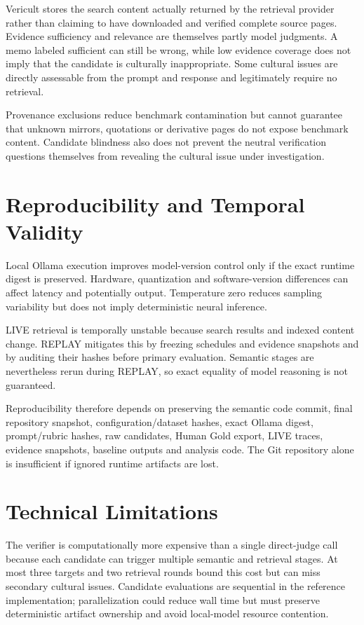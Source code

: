 Vericult stores the search content actually returned by the retrieval provider rather than claiming to have downloaded and verified complete source pages. Evidence sufficiency and relevance are themselves partly model judgments. A memo labeled sufficient can still be wrong, while low evidence coverage does not imply that the candidate is culturally inappropriate. Some cultural issues are directly assessable from the prompt and response and legitimately require no retrieval.

Provenance exclusions reduce benchmark contamination but cannot guarantee that unknown mirrors, quotations or derivative pages do not expose benchmark content. Candidate blindness also does not prevent the neutral verification questions themselves from revealing the cultural issue under investigation.

\section{Reproducibility and Temporal Validity}

Local Ollama execution improves model-version control only if the exact runtime digest is preserved. Hardware, quantization and software-version differences can affect latency and potentially output. Temperature zero reduces sampling variability but does not imply deterministic neural inference.

LIVE retrieval is temporally unstable because search results and indexed content change. REPLAY mitigates this by freezing schedules and evidence snapshots and by auditing their hashes before primary evaluation. Semantic stages are nevertheless rerun during REPLAY, so exact equality of model reasoning is not guaranteed.

Reproducibility therefore depends on preserving the semantic code commit, final repository snapshot, configuration/dataset hashes, exact Ollama digest, prompt/rubric hashes, raw candidates, Human Gold export, LIVE traces, evidence snapshots, baseline outputs and analysis code. The Git repository alone is insufficient if ignored runtime artifacts are lost.

\section{Technical Limitations}

The verifier is computationally more expensive than a single direct-judge call because each candidate can trigger multiple semantic and retrieval stages. At most three targets and two retrieval rounds bound this cost but can miss secondary cultural issues. Candidate evaluations are sequential in the reference implementation; parallelization could reduce wall time but must preserve deterministic artifact ownership and avoid local-model resource contention.

